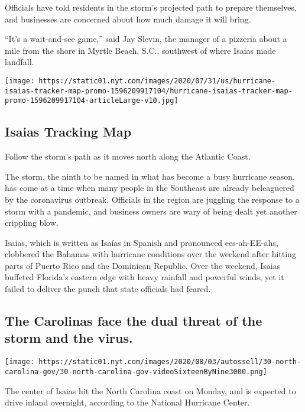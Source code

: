 Officials have told residents in the storm's projected path to prepare
themselves, and businesses are concerned about how much damage it will
bring.

``It's a wait-and-see game,'' said Jay Slevin, the manager of a pizzeria
about a mile from the shore in Myrtle Beach, S.C., southwest of where
Isaias made landfall.

\href{https://www.nytimes.com/interactive/2020/07/31/us/hurricane-isaias-tracker-map.html}{}

\texttt{[image: https://static01.nyt.com/images/2020/07/31/us/hurricane-isaias-tracker-map-promo-1596209917104/hurricane-isaias-tracker-map-promo-1596209917104-articleLarge-v10.jpg]}

\hypertarget{isaias-tracking-map}{%
\subsection{Isaias Tracking Map}\label{isaias-tracking-map}}

Follow the storm's path as it moves north along the Atlantic Coast.

The storm, the ninth to be named in what has become a busy hurricane
season, has come at a time when many people in the Southeast are already
beleaguered by the coronavirus outbreak. Officials in the region are
juggling the response to a storm with a pandemic, and business owners
are wary of being dealt yet another crippling blow.

Isaias, which is written as Isaías in Spanish and pronounced
ees-ah-EE-ahs, clobbered the Bahamas with hurricane conditions over the
weekend after hitting parts of Puerto Rico and the Dominican Republic.
Over the weekend, Isaias buffeted Florida's eastern edge with heavy
rainfall and powerful winds, yet it failed to deliver the punch that
state officials had feared.

\hypertarget{the-carolinas-face-the-dual-threat-of-the-storm-and-the-virus}{%
\subsection{The Carolinas face the dual threat of the storm and the
virus.}\label{the-carolinas-face-the-dual-threat-of-the-storm-and-the-virus}}

\texttt{[image: https://static01.nyt.com/images/2020/08/03/autossell/30-north-carolina-gov/30-north-carolina-gov-videoSixteenByNine3000.png]}

The center of Isaias hit the North Carolina coast on Monday, and is
expected to drive inland overnight, according to the National Hurricane
Center.

